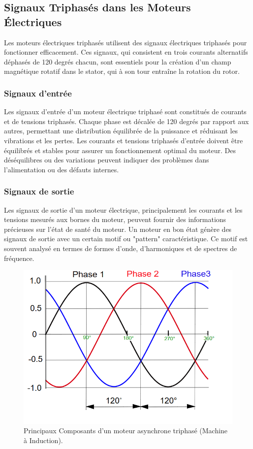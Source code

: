 \subsection*{Signaux Triphasés dans les Moteurs Électriques}

Les moteurs électriques triphasés utilisent des signaux électriques triphasés
pour fonctionner efficacement. Ces signaux, qui consistent en trois courants
alternatifs déphasés de 120 degrés chacun, sont essentiels pour la création
d'un champ magnétique rotatif dans le stator, qui à son tour entraîne la
rotation du rotor.

\subsubsection*{Signaux d'entrée}

Les signaux d'entrée d'un moteur électrique triphasé sont constitués de
courants et de tensions triphasés. Chaque phase est décalée de 120 degrés par
rapport aux autres, permettant une distribution équilibrée de la puissance et
réduisant les vibrations et les pertes. Les courants et tensions triphasés
d'entrée doivent être équilibrés et stables pour assurer un fonctionnement
optimal du moteur. Des déséquilibres ou des variations peuvent indiquer des
problèmes dans l'alimentation ou des défauts internes.

\subsubsection*{Signaux de sortie}

Les signaux de sortie d'un moteur électrique, principalement les courants et
les tensions mesurés aux bornes du moteur, peuvent fournir des informations
précieuses sur l'état de santé du moteur. Un moteur en bon état génère des
signaux de sortie avec un certain motif ou "pattern" caractéristique. Ce motif
est souvent analysé en termes de formes d'onde, d'harmoniques et de spectres de
fréquence.

\begin{figure}[hbt!]
	\centering
	\includegraphics[width=12cm]{images_pfe/triphase.png}
	\caption{
		Principaux Composants d'un moteur asynchrone triphasé (Machine à Induction).}
	\label{fig:moteur-asynchrone}
\end{figure}
\FloatBarrier

